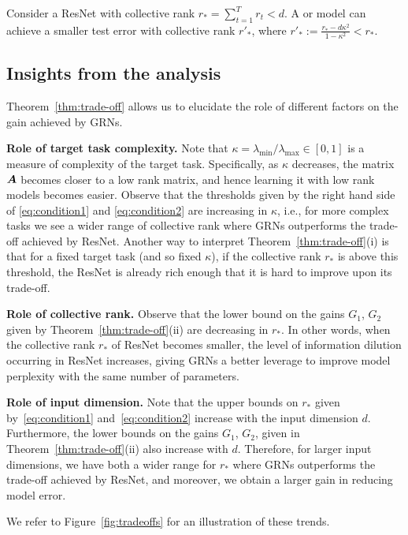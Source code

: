 \begin{proposition}\label{pro:rank-reduction}
Consider a ResNet with collective rank $r_* = \sum_{t=1}^T r_t < d$. A \GenA{} or \GenB{} model can achieve a smaller test error with collective rank $r'_*$, where $r'_*:=\frac{r_*-d\kappa^2}{1-\kappa^2} < r_*$. 
\end{proposition}
\subsection{Insights from the analysis} Theorem~\ref{thm:trade-off} allows us to elucidate the role of different factors on the gain achieved by GRNs. 

{\bf Role of target task complexity.} Note that $\kappa=\lambda_{\min}/\lambda_{\max}\in [0,1]$ is a measure of complexity of the target task. Specifically, as $\kappa$ decreases, the matrix ${\bm{A}}$ becomes closer to a low rank matrix, and hence learning it with low rank models becomes easier. Observe that the thresholds given by the right hand side of \eqref{eq:condition1} and \eqref{eq:condition2} are increasing in $\kappa$, i.e., for more complex tasks we see a wider range of collective rank where GRNs outperforms the trade-off achieved by ResNet. Another way to  interpret Theorem~\ref{thm:trade-off}(i) is that for a fixed target task (and so fixed $\kappa$), if the collective rank $r_*$ is above this threshold, the ResNet is already rich enough that it is hard to improve upon its trade-off. 

{\bf Role of collective rank.} Observe that the lower bound on the gains $G_1$, $G_2$ given by Theorem~\ref{thm:trade-off}(ii) are decreasing in $r_*$. In other words, when the collective rank $r_*$ of ResNet becomes smaller, the level of information dilution occurring in ResNet increases, giving GRNs a better leverage to improve model perplexity with the same number of parameters.


{\bf Role of input dimension.} Note that the upper bounds on $r_*$ given by~\eqref{eq:condition1} and~\eqref{eq:condition2} increase with the input dimension $d$. Furthermore, the lower bounds on the gains $G_1$, $G_2$, given in Theorem~\ref{thm:trade-off}(ii) also increase with $d$. Therefore, for larger input dimensions, we have both a wider range for $r_*$ where GRNs outperforms the trade-off achieved by ResNet, and moreover, we obtain a larger gain in reducing model error.

We refer to Figure~\ref{fig:tradeoffs} for an illustration of these trends.

